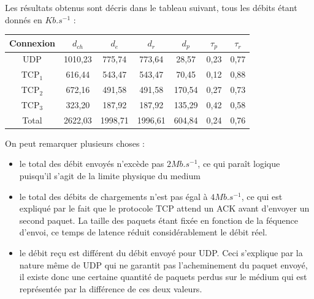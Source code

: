 \documentclass[a4paper]{article}
\begin{document}
Les résultats obtenus sont décris dans le tableau suivant, tous les débits étant donnés en
$Kb.s^{-1}$ :

\begin{center}
	\begin{tabular}{|c|c|c|c|c|c|c|} \hline
		Connexion & $d_{ch} $& $d_e$ & $d_r$ & $d_p$ & $\tau_p$ & $\tau_r$ \\ \hline
		UDP & 1010,23 & 775,74 & 773,64 & 28,57 & 0,23 & 0,77 \\ \hline
		TCP$_1$ & 616,44 & 543,47 & 543,47 & 70,45 & 0,12 & 0,88 \\ \hline
		TCP$_2$ & 672,16 & 491,58 & 491,58 & 170,54 & 0,27 & 0,73 \\ \hline
		TCP$_3$ & 323,20 & 187,92 & 187,92 & 135,29 & 0,42 & 0,58 \\ \hline
		Total & 2622,03 & 1998,71 & 1996,61 & 604,84 & 0,24 & 0,76 \\ \hline
	\end{tabular}
\end{center}

On peut remarquer plusieurs choses : 
\begin{itemize}
	\item le total des débit envoyés n'excède pas $2Mb.s^{-1}$, ce qui paraît logique puisqu'il s'agit
	de la limite physique du medium
	\item le total des débits de chargements n'est pas égal à $4Mb.s^{-1}$, ce qui est expliqué par le
	fait que le protocole TCP attend un ACK avant d'envoyer un second paquet. La taille des paquets
	étant fixée en fonction de la féquence d'envoi, ce temps de latence réduit considérablement le
	débit réel.
	\item le débit reçu est différent du débit envoyé pour UDP. Ceci s'explique par la nature même de
	UDP qui ne garantit pas l'acheminement du paquet envoyé, il existe donc une certaine quantité de
	paquets perdus sur le médium qui est représentée par la différence de ces deux valeurs.
\end{itemize}
\end{document}
